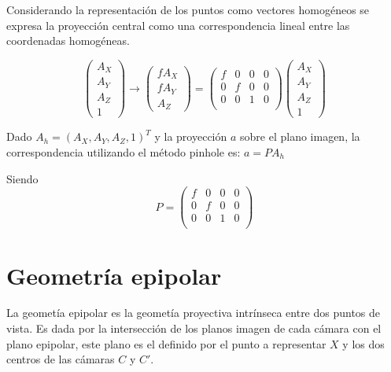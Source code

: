 Considerando la representación de los puntos como vectores homogéneos se expresa la proyección central como una correspondencia lineal entre las coordenadas homogéneas.

\[
\begin{pmatrix}
A_X \\ A_Y \\ A_Z \\ 1
\end{pmatrix}
\to
\begin{pmatrix}
fA_X \\ fA_Y \\ A_Z
\end{pmatrix}
=
\begin{pmatrix}
f & 0 & 0 & 0 \\
0 & f & 0 & 0 \\
0 & 0 & 1 & 0 \\
\end{pmatrix}
\begin{pmatrix}
A_X \\ A_Y \\ A_Z \\ 1
\end{pmatrix}
\]

Dado $A_h = (A_X,A_Y,A_Z,1)^T$ y la proyección $a$ sobre el plano imagen, la correspondencia utilizando el método pinhole es:
$a=PA_h$

Siendo
\[
P = 
\begin{pmatrix}
f & 0 & 0 & 0 \\
0 & f & 0 & 0 \\
0 & 0 & 1 & 0 \\
\end{pmatrix}
\]

\section{Geometría epipolar}
\cite{LibroCompGrafica3} La geometía epipolar es la geometía proyectiva intrínseca entre dos puntos de vista. Es dada por la intersección de los planos imagen de cada cámara con el plano epipolar, este plano es el definido por el punto a representar $X$ y los dos centros de las cámaras $C$ y $C'$.

